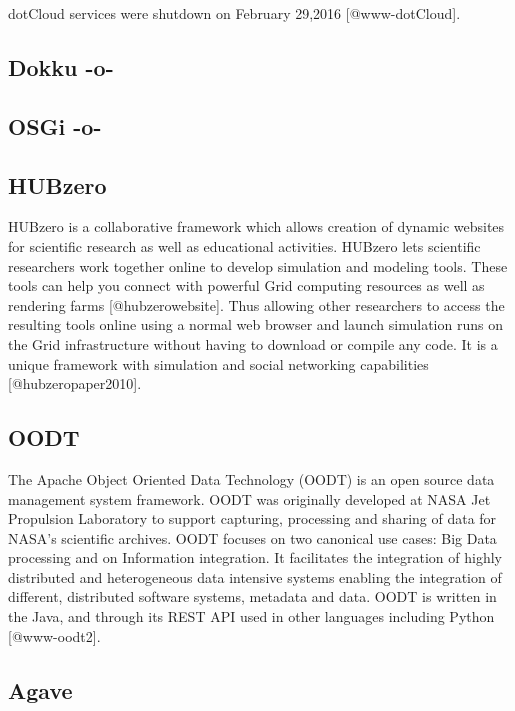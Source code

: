 dotCloud services were shutdown on February
29,2016 [@www-dotCloud].


    

\subsection{Dokku -o-}



\subsection{OSGi -o-}



\subsection{HUBzero}
     
HUBzero is a collaborative framework which allows creation of dynamic
websites for scientific research as well as educational activities.
HUBzero lets scientific researchers work together online to develop
simulation and modeling tools.  These tools can help you connect with
powerful Grid computing resources as well as rendering
farms [@hubzerowebsite]. Thus allowing other researchers to access
the resulting tools online using a normal web browser and launch
simulation runs on the Grid infrastructure without having to download
or compile any code. It is a unique framework with simulation and
social networking capabilities [@hubzeropaper2010].

\subsection{OODT}
     
The Apache Object Oriented Data Technology (OODT) is an open source
data management system framework. OODT was originally developed at
NASA Jet Propulsion Laboratory to support capturing, processing and
sharing of data for NASA's scientific archives. OODT focuses on two
canonical use cases: Big Data processing and on Information
integration. It facilitates the integration of highly distributed and
heterogeneous data intensive systems enabling the integration of
different, distributed software systems, metadata and data. OODT is
written in the Java, and through its REST API used in other languages
including Python [@www-oodt2].
     
\subsection{Agave}

